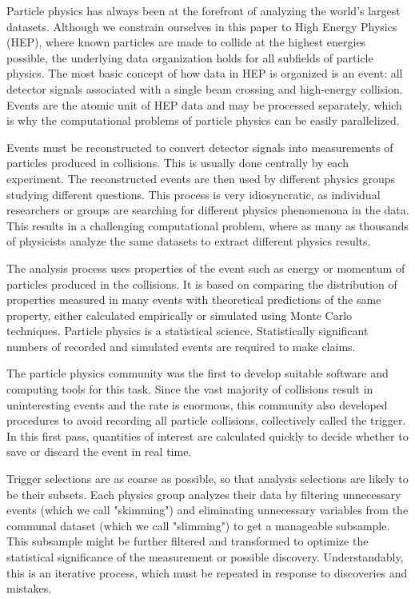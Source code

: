 \documentclass[a4paper]{jpconf}
\begin{document}
Particle physics has always been at the forefront of analyzing the world's largest datasets. Although we constrain ourselves in this paper to High Energy Physics (HEP), where known particles are made to collide at the highest energies possible, the underlying data organization holds for all subfields of particle physics. The most basic concept of how data in HEP is organized is an event: all detector signals associated with a single beam crossing and high-energy collision. Events are the atomic unit of HEP data and may be processed separately, which is why the computational problems of particle physics can be easily parallelized. 

Events must be reconstructed to convert detector signals into measurements of particles produced in collisions. This is usually done centrally by each experiment. The reconstructed events are then used by different physics groups studying different questions. This process is very idiosyncratic, as individual researchers or groups are searching for different physics phenomenona in the data. This results in a challenging computational problem, where as many as thousands of physicists analyze the same datasets to extract different physics results.

The analysis process uses properties of the event such as energy or momentum of particles produced in the collisions. It is based on comparing the distribution of properties measured in many events with theoretical predictions of the same property, either calculated empirically or simulated using Monte Carlo techniques. Particle physics is a statistical science. Statistically significant numbers of recorded and simulated events are required to make claims.

The particle physics community was the first to develop suitable software and computing tools for this task. Since the vast majority of collisions result in uninteresting events and the rate is enormous, this community also developed procedures to avoid recording all particle collisions, collectively called the trigger. In this first pass, quantities of interest are calculated quickly to decide whether to save or discard the event in real time.

Trigger selections are as coarse as possible, so that analysis selections are likely to be their subsets. Each physics group analyzes their data by filtering unnecessary events (which we call "skimming") and eliminating unnecessary variables from the communal dataset (which we call "slimming") to get a manageable subsample. This subsample might be further filtered and transformed to optimize the statistical significance of the measurement or possible discovery. Understandably, this is an iterative process, which must be repeated in response to discoveries and mistakes.
\end{document}
